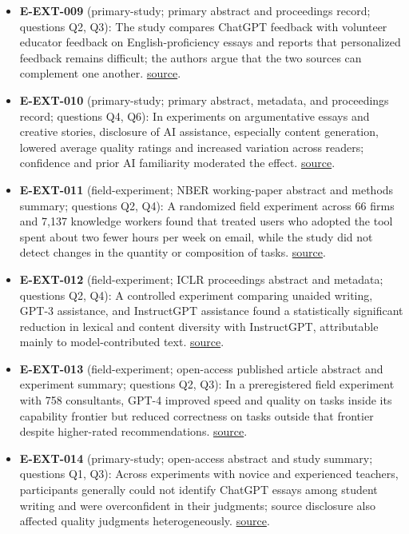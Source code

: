\documentclass[11pt]{article}
\begin{document}
\begin{itemize}
\item
  \textbf{E-EXT-009} (primary-study; primary abstract and proceedings record; questions Q2, Q3): The study compares ChatGPT feedback with volunteer educator feedback on English-proficiency essays and reports that personalized feedback remains difficult; the authors argue that the two sources can complement one another. \href{https://aclanthology.org/2024.lrec-main.144/}{source}.
\item
  \textbf{E-EXT-010} (primary-study; primary abstract, metadata, and proceedings record; questions Q4, Q6): In experiments on argumentative essays and creative stories, disclosure of AI assistance, especially content generation, lowered average quality ratings and increased variation across readers; confidence and prior AI familiarity moderated the effect. \href{https://aclanthology.org/2024.emnlp-main.279/}{source}.
\item
  \textbf{E-EXT-011} (field-experiment; NBER working-paper abstract and methods summary; questions Q2, Q4): A randomized field experiment across 66 firms and 7,137 knowledge workers found that treated users who adopted the tool spent about two fewer hours per week on email, while the study did not detect changes in the quantity or composition of tasks. \href{https://www.nber.org/papers/w33795}{source}.
\item
  \textbf{E-EXT-012} (field-experiment; ICLR proceedings abstract and metadata; questions Q2, Q4): A controlled experiment comparing unaided writing, GPT-3 assistance, and InstructGPT assistance found a statistically significant reduction in lexical and content diversity with InstructGPT, attributable mainly to model-contributed text. \href{https://proceedings.iclr.cc/paper_files/paper/2024/hash/02dec8877fb7c6aa9a79f81661baca7c-Abstract-Conference.html}{source}.
\item
  \textbf{E-EXT-013} (field-experiment; open-access published article abstract and experiment summary; questions Q2, Q3): In a preregistered field experiment with 758 consultants, GPT-4 improved speed and quality on tasks inside its capability frontier but reduced correctness on tasks outside that frontier despite higher-rated recommendations. \href{https://www.hbs.edu/ris/Publication\%20Files/dell-acqua-et-al-2026-navigating-the-jagged-technological-frontier_5c589c8c-fbb5-458f-b285-c944746cd717.pdf}{source}.
\item
  \textbf{E-EXT-014} (primary-study; open-access abstract and study summary; questions Q1, Q3): Across experiments with novice and experienced teachers, participants generally could not identify ChatGPT essays among student writing and were overconfident in their judgments; source disclosure also affected quality judgments heterogeneously. \href{https://www.sciencedirect.com/science/article/pii/S2666920X24000109}{source}.

\end{itemize}
\end{document}
